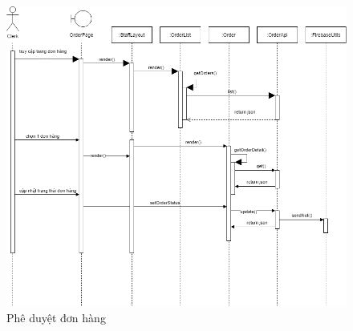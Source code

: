 \newpage

\begin{figure}[!h]
    \begin{center}
        \includegraphics[scale=0.45]{Images/SequenceDiagram/OrderStatus.png}
    \end{center}
    \hspace{0.3cm}
    \caption{Phê duyệt đơn hàng}
\end{figure}